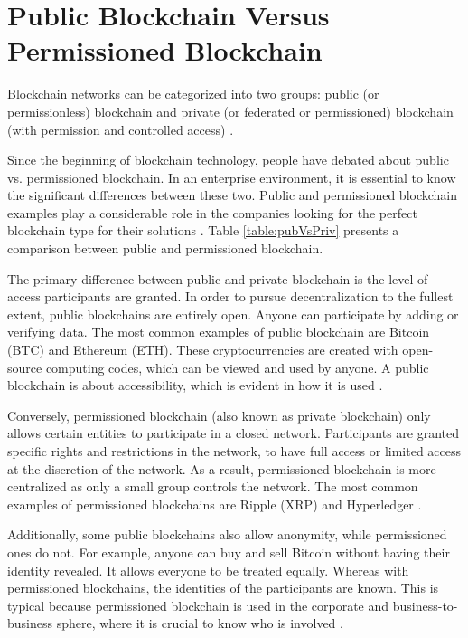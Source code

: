 \section{Public Blockchain Versus Permissioned Blockchain}\label{sec:versus}

Blockchain networks can be categorized into two groups: public (or permissionless) blockchain and private (or federated or permissioned) blockchain (with permission and controlled access) \cite{greve2018blockchain}.

Since the beginning of blockchain technology, people have debated about public vs. permissioned blockchain. In an enterprise environment, it is essential to know the significant differences between these two. Public and permissioned blockchain examples play a considerable role in the companies looking for the perfect blockchain type for their solutions \cite{101blockchains}. Table \ref{table:pubVsPriv} presents a comparison between public and permissioned blockchain.

The primary difference between public and private blockchain is the level of access participants are granted. In order to pursue decentralization to the fullest extent, public blockchains are entirely open. Anyone can participate by adding or verifying data. The most common examples of public blockchain are Bitcoin (BTC) and Ethereum (ETH). These cryptocurrencies are created with open-source computing codes, which can be viewed and used by anyone. A public blockchain is about accessibility, which is evident in how it is used \cite{selfkeyOrg}. 

Conversely, permissioned blockchain (also known as private blockchain) only allows certain entities to participate in a closed network. Participants are granted specific rights and restrictions in the network, to have full access or limited access at the discretion of the network. As a result, permissioned blockchain is more centralized as only a small group controls the network. The most common examples of permissioned blockchains are Ripple (XRP) and Hyperledger \cite{blockgeeks2018deeper}.

Additionally, some public blockchains also allow anonymity, while permissioned ones do not. For example, anyone can buy and sell Bitcoin without having their identity revealed. It allows everyone to be treated equally. Whereas with permissioned blockchains, the identities of the participants are known. This is typical because permissioned blockchain is used in the corporate and business-to-business sphere, where it is crucial to know who is involved \cite{101blockchains}.

